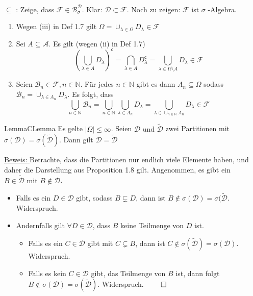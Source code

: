 \documentclass[11.5 pt, a4paper]{memoir}
\begin{document}
	 \underline{$ \subseteq $} : Zeige, dass $ \mathcal{F} \in \mathcal{B}^{ \mathcal{D}}_{\sigma}  $. Klar: $ \mathcal{D} \subset 
	\mathcal{F}$. Noch zu zeigen: $ \mathcal{F} $ ist $ \sigma $ -Algebra.
	\begin{enumerate}[label=\alph*)]
		\item Wegen (iii) in Def 1.7 gilt $ \Omega  = \cup_{\lambda \in \Omega } D_{\lambda} \in \mathcal{F} $ 
		\item Sei $ A \subseteq \mathcal{A} $. Es gilt (wegen (ii) in Def 1.7)
			$$ \left( \bigcup_{\lambda \in A} D_{\lambda} \right)^{\mathsf{c}} = \bigcap_{\lambda \in A}D_{\lambda}^{\mathsf{c}} = 
			\bigcup_{\lambda \in \Omega \setminus A} D_{\lambda} \in \mathcal{F} $$
		\item Seien $ \mathcal{B}_{n} \in \mathcal{F}, n \in \mathbb{N} $. Für jedes $ n \in \mathbb{N} $  gibt es dann $ A_n \subseteq \Omega  $ sodass $ \mathcal{B}_{n}
			= \cup_{\lambda \in A_n} D_{\lambda}$. Es folgt, dass 
			$$ \bigcup_{n \in \mathbb{N}} \mathcal{B}_{n} = \bigcup_{n \in \mathbb{N}} \bigcup_{\lambda \in A_n} D_{\lambda} = \bigcup_{\lambda \in \cup_{n \in \mathbb{N}}A_n} D_{\lambda} \in \mathcal{F} $$
			
	\end{enumerate}
\begin{ibox}[1.9]{Lemma}{CLemma} 
	Es gelte $ \left| \Omega  \right| \leq \infty $. Seien $ \mathcal{D} \text{ und }  \tilde{\mathcal{D}} $ zwei Partitionen mit $ \sigma (\mathcal{D}) = \sigma (\tilde{\mathcal{D}}) $. Dann gilt $ \mathcal{D} = \tilde{\mathcal{D}} $ 
\end{ibox}
\underline{Beweis: }	Betrachte, dass die Partitionen nur endlich viele Elemente haben, und daher die Darstellung aus Proposition 
1.8 gilt. Angenommen, es gibt ein $ B \in \tilde{\mathcal{D}} \text{  mit } B \notin \mathcal{D} $.
\begin{itemize}
	\item Falls es ein $ D \in \mathcal{D} $ gibt, sodass $ B \subsetneq D $, dann ist $ B \notin \sigma ( \mathcal{D}) = \sigma ( \tilde{
		\mathcal{D}}$. Widerspruch.
	\item Andernfalls gilt $ \forall D \in \mathcal{D} $, dass $ B $ keine Teilmenge von $ D $ ist.
		\begin{itemize}
			\item Falls es ein $ C \in \mathcal{D} $ gibt mit $ C \subsetneq B $, dann ist $ C \notin \sigma (\tilde{ \mathcal{D}}) 
				= \sigma ( \mathcal{D})$. Widerspruch.  
			\item Falls es kein $ C \in \mathcal{D} $ gibt, das Teilmenge von $ B $ ist, dann folgt $ B \notin \sigma ( \mathcal{D}) = \sigma
				(\tilde{ \mathcal{D}})$. Widerspruch. $ \qed $ 
		\end{itemize}
\end{itemize}
\end{document}
